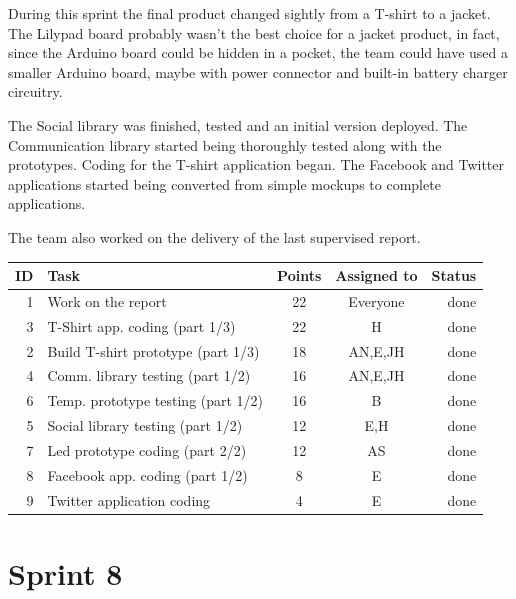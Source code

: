 During this sprint the final product changed sightly from a T-shirt to a jacket.
The Lilypad board probably wasn't the best choice for a jacket product, in fact,
since the Arduino board could be hidden in a pocket, the team could have used
a smaller Arduino board, maybe with power connector and built-in battery
charger circuitry.

The Social library was finished, tested and an initial version deployed.
The Communication library started being thoroughly tested along with the prototypes.
Coding for the T-shirt application began. The Facebook and Twitter applications
started being converted from simple mockups to complete applications.

The team also worked on the delivery of the last supervised report.

\begin{table}[ht!]
\begin{tabular}{ | r | l | c | c | r | }

\hline
\textbf{ID} & \textbf{Task} & \textbf{Points} & \textbf{Assigned to} & \textbf{Status} \\
\hline

1 & Work on the report							& 22 & Everyone		& done \\
\hline
3 & T-Shirt app. coding (part 1/3)				& 22 & H			& done \\
\hline
2 & Build T-shirt prototype (part 1/3)			& 18 & AN,E,JH		& done \\
\hline
4 & Comm. library testing (part 1/2)			& 16 & AN,E,JH		& done \\
\hline
6 & Temp. prototype testing (part 1/2)			& 16 & B			& done \\
\hline
5 & Social library testing (part 1/2)			& 12 & E,H			& done \\
\hline
7 & Led prototype coding (part 2/2)				& 12 & AS			& done \\
\hline
8 & Facebook app. coding (part 1/2)				& 8  & E			& done \\
\hline
9 & Twitter application coding					& 4  & E			& done \\
\hline

\end{tabular}
\end{table}

\newpage

\section{Sprint 8}

